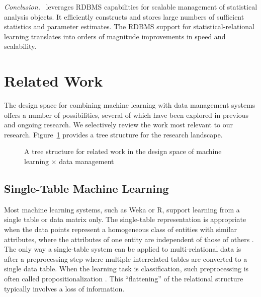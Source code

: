{\em Conclusion.} \FB\ leverages RDBMS capabilities for scalable management of statistical analysis objects. It efficiently constructs and stores large numbers of sufficient statistics and parameter estimates. 
The RDBMS support for statistical-relational learning translates into orders of magnitude improvements in speed and scalability.


\section{Related Work} \label{sec:related}

The design space for combining machine learning with data management systems offers a number of possibilities, several of which have been explored in previous and ongoing research. 
We selectively review the work most relevant to our research. Figure~\ref{fig:related} provides a tree structure for the research landscape. 

\begin{figure}[htbp] %
 \centering
{}
\caption{A tree structure for related work in the design space of machine learning $\times$ data management}
\label{fig:related}
\end{figure}

\subsection{Single-Table Machine Learning} Most machine learning systems, such as Weka or R, support learning from a single table or data matrix only. The single-table representation is appropriate when the data points represent a homogeneous class of entities with similar attributes, where the attributes of one entity are independent of those of others \cite{Kimmig2015}. The only way a single-table system can be applied to multi-relational data is after a preprocessing step where multiple interrelated tables are converted to a single data table. When the learning task is classification, such preprocessing is often called propositionalization  \cite{Kimmig2015}.  This ``flattening'' of the relational structure typically involves a loss of information.  

